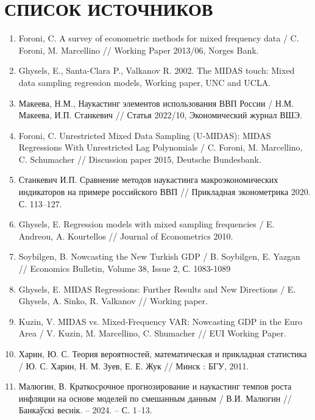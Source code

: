 \documentclass[a4paper, 12pt]{extarticle}
\numberwithin{equation}{subsection}
\begin{document}
	\section*{СПИСОК ИСТОЧНИКОВ}
	\begin{enumerate}
		\item Foroni, C. A survey of econometric methods for mixed frequency data / C. Foroni, M. Marcellino // Working Paper 2013/06, Norges Bank.
		\item Ghysels, E., Santa-Clara P., Valkanov R. 2002. The MIDAS touch: Mixed data sampling regression models, Working paper, UNC and UCLA.
		\item Макеева, Н.М., Наукастинг элементов использования ВВП России / Н.М. Макеева, И.П. Станкевич // Статья 2022/10, Экономический журнал ВШЭ.
		\item Foroni, C. Unrestricted Mixed Data Sampling (U-MIDAS): MIDAS Regressions With Unrestricted Lag Polynomials / C. Foroni, M. Marcellino, C. Schumacher // Discussion paper 2015, Deutsche Bundesbank.
		\item Станкевич И.П. Сравнение методов наукастинга макроэкономических индикаторов на примере российского ВВП // Прикладная эконометрика 2020. С. 113–127.
		\item Ghysels, E. Regression models with mixed sampling frequencies /  E. Andreou, A. Kourtellos // Journal of Econometrics 2010.
		\item Soybilgen, B. Nowcasting the New Turkish GDP / B. Soybilgen, E. Yazgan // Economics Bulletin, Volume 38, Issue 2, 
		С. 1083-1089
		\item Ghysels, E. MIDAS Regressions: Further Results and New Directions / E. Ghysels, A. Sinko, R. Valkanov // Working paper.
		\item Kuzin, V. MIDAS vs. Mixed-Frequency VAR:
		Nowcasting GDP in the Euro Area / V. Kuzin,
		M. Marcellino, C. Shumacher // EUI Working Paper.
		\item Харин, Ю. С. Теория вероятностей,
		математическая
		и прикладная статистика / Ю. С. Харин, Н. М. Зуев, Е. Е. Жук // Минск : БГУ, 2011. 
		\item Малюгин, В. Краткосрочное прогнозирование и наукастинг темпов роста инфляции на основе моделей по смешанным данным / В.И. Малюгин // Банкаўскі веснік. – 2024. – С. 1–13.
	\end{enumerate}
	\newpage
\end{document}
